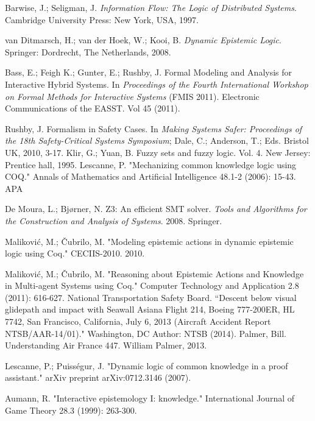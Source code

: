 \begin{thebibliography}{9}
	 	Barwise, J.; Seligman, J. {\em Information Flow: The Logic of Distributed Systems}. Cambridge University Press: New York, USA, 1997.
	 	
	 	van Ditmarsch, H.; van der Hoek, W.; Kooi, B. {\em Dynamic Epistemic Logic}. Springer: Dordrecht, The Netherlands, 2008.
	 	
	 	 Bass, E.; Feigh K.; Gunter, E.; Rushby, J. Formal Modeling and Analysis for Interactive Hybrid Systems. In {\em Proceedings of the Fourth International Workshop on Formal Methods for Interactive Systems} (FMIS 2011). Electronic Communications of the EASST. Vol 45 (2011).
	 	
	 	Rushby, J. Formalism in Safety Cases. In {\em Making Systems Safer: Proceedings of the 18th Safety-Critical Systems Symposium}; Dale, C.; Anderson, T.; Eds. Bristol UK, 2010, 3-17.
	 	Klir, G.; Yuan, B. Fuzzy sets and fuzzy logic. Vol. 4. New Jersey: Prentice hall, 1995.
	 	Lescanne, P. "Mechanizing common knowledge logic using COQ." Annals of Mathematics and Artificial Intelligence 48.1-2 (2006): 15-43.
	 	APA	
	 	
 		 De Moura, L.; Bj{\o}rner, N. Z3: An efficient SMT solver. \emph{Tools and Algorithms for the Construction and Analysis of Systems}. 2008. Springer.
	 	
	 	Malikovi\'c, M.; \v Cubrilo, M. "Modeling epistemic actions in dynamic epistemic logic using Coq." CECIIS-2010. 2010.
	 	
	 	Malikovi\'c, M.; \v Cubrilo, M. "Reasoning about Epistemic Actions and Knowledge in Multi-agent Systems using Coq." Computer Technology and Application 2.8 (2011): 616-627.
	 	National Transportation Safety Board. ``Descent below visual glidepath and impact with Seawall Asiana Flight 214, Boeing 777-200ER, HL 7742, San Francisco, California, July 6, 2013 (Aircraft Accident Report NTSB/AAR-14/01)." Washington, DC Author: NTSB (2014).
	 	Palmer, Bill. Understanding Air France 447. William Palmer, 2013.
	 	
	 	Lescanne, P.; Puiss\'egur, J. "Dynamic logic of common knowledge in a proof assistant." arXiv preprint arXiv:0712.3146 (2007).
	 	
	 	Aumann, R. "Interactive epistemology I: knowledge." International Journal of Game Theory 28.3 (1999): 263-300.
	 	

\end{thebibliography}
